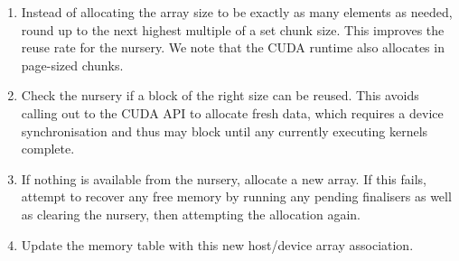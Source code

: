 \begin{enumerate}
\item Instead of allocating the array size to be exactly as many elements as
    needed, round up to the next highest multiple of a set chunk size. This
    improves the reuse rate for the nursery. We note that the CUDA runtime also
    allocates in page-sized chunks.

\item Check the nursery if a block of the right size can be reused. This avoids
    calling out to the CUDA API to allocate fresh data, which requires a
    device synchronisation and thus may block until any currently executing
    kernels complete.

\item If nothing is available from the nursery, allocate a new array. If this
    fails, attempt to recover any free memory by running any pending finalisers
    as well as clearing the nursery, then attempting the allocation again.

\item Update the memory table with this new host/device array association.

\end{enumerate}

